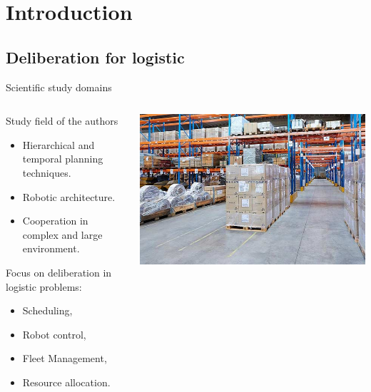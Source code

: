 \section{Introduction}
\subsection{Deliberation for logistic}

\begin{frame}{Scientific study domains}
    \centering
\begin{columns}
    \begin{column}{0.5\textwidth}
        Study field of the authors 
        \small
        \begin{itemize}
            \item Hierarchical and temporal planning techniques.
            \item Robotic architecture.
            \item Cooperation in complex and large environment.
        \end{itemize}
        Focus on deliberation in logistic problems: 
        \small
        \begin{itemize}
            \item Scheduling,
            \item Robot control,
            \item Fleet Management,
            \item Resource allocation.
        \end{itemize}
    \end{column}
    \begin{column}{0.5\textwidth}
        \includegraphics[width = \textwidth]{images/logisticsolutions.jpg}
    \end{column}
\end{columns}

\end{frame}

